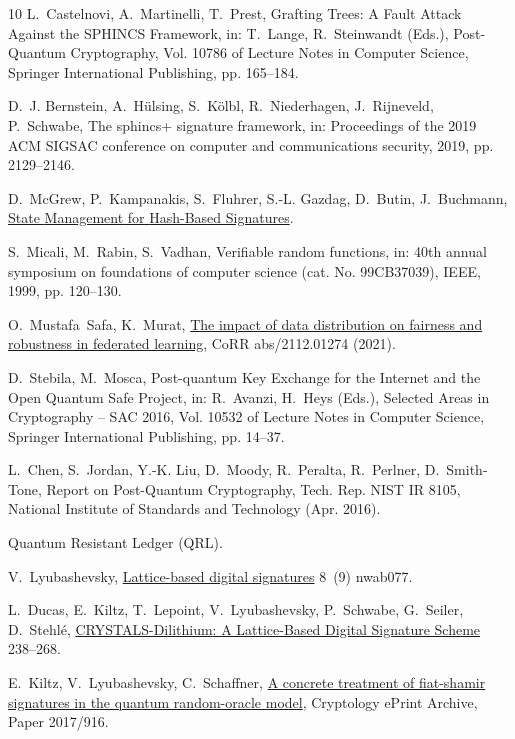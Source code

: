 \documentclass[5p,times]{elsarticle}
\theoremstyle{definition}
\theoremstyle{remark}
\numberwithin{equation}{section}
\begin{document}
\begin{thebibliography}{10}
L.~Castelnovi, A.~Martinelli, T.~Prest, Grafting {{Trees}}: {{A Fault Attack
  Against}} the {{SPHINCS Framework}}, in: T.~Lange, R.~Steinwandt (Eds.),
  Post-{{Quantum Cryptography}}, Vol. 10786 of Lecture {{Notes}} in {{Computer
  Science}}, {Springer International Publishing}, pp. 165--184.

D.~J. Bernstein, A.~H{\"u}lsing, S.~K{\"o}lbl, R.~Niederhagen, J.~Rijneveld,
  P.~Schwabe, The sphincs+ signature framework, in: Proceedings of the 2019 ACM
  SIGSAC conference on computer and communications security, 2019, pp.
  2129--2146.

D.~McGrew, P.~Kampanakis, S.~Fluhrer, S.-L. Gazdag, D.~Butin, J.~Buchmann,
  \href{http://eprint.iacr.org/2016/357}{State {{Management}} for {{Hash-Based
  Signatures}}}.

S.~Micali, M.~Rabin, S.~Vadhan, Verifiable random functions, in: 40th annual
  symposium on foundations of computer science (cat. No. 99CB37039), IEEE,
  1999, pp. 120--130.

O.~Mustafa~Safa, K.~Murat, \href{https://arxiv.org/abs/2112.01274}{The impact
  of data distribution on fairness and robustness in federated learning}, CoRR
  abs/2112.01274 (2021).

D.~Stebila, M.~Mosca, Post-quantum {{Key Exchange}} for the {{Internet}} and
  the {{Open Quantum Safe Project}}, in: R.~Avanzi, H.~Heys (Eds.), Selected
  {{Areas}} in {{Cryptography}} – {{SAC}} 2016, Vol. 10532 of Lecture
  {{Notes}} in {{Computer Science}}, {Springer International Publishing}, pp.
  14--37.


L.~Chen, S.~Jordan, Y.-K. Liu, D.~Moody, R.~Peralta, R.~Perlner, D.~Smith-Tone,
  Report on {Post}-{Quantum} {Cryptography}, Tech. Rep. NIST IR 8105, National
  Institute of Standards and Technology (Apr. 2016).

Quantum {{Resistant Ledger}} ({{QRL}}).

V.~Lyubashevsky,
  \href{https://academic.oup.com/nsr/article/doi/10.1093/nsr/nwab077/6272426}{Lattice-based
  digital signatures} 8~(9)  nwab077.


L.~Ducas, E.~Kiltz, T.~Lepoint, V.~Lyubashevsky, P.~Schwabe, G.~Seiler,
  D.~Stehlé,
  \href{https://tches.iacr.org/index.php/TCHES/article/view/839}{{{CRYSTALS-Dilithium}}:
  {{A Lattice-Based Digital Signature Scheme}}}  238--268.


E.~Kiltz, V.~Lyubashevsky, C.~Schaffner,
  \href{https://eprint.iacr.org/2017/916}{A concrete treatment of fiat-shamir
  signatures in the quantum random-oracle model}, Cryptology ePrint Archive,
  Paper 2017/916.

\end{thebibliography}
\end{document}
